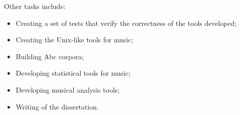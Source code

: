 \documentclass[main.tex]{subfiles}
\begin{document}
Other tasks include:
\begin{itemize}
  \item Creating a set of tests that verify the correctness of the tools developed;
  \item Creating the Unix-like tools for music;
  \item Building Abc corpora;
  \item Developing statistical tools for music;
  \item Developing musical analysis tools;
  \item Writing of the dissertation.
\end{itemize}
\end{document}
